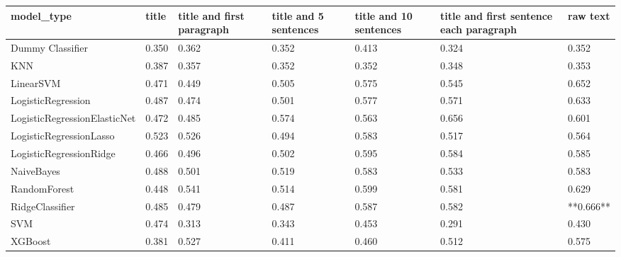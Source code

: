 \begin{tabular}{lllllll}
\toprule
                  model\_type & title & title and first paragraph & title and 5 sentences & title and 10 sentences & title and first sentence each paragraph &  raw text \\
\midrule
            Dummy Classifier & 0.350 &                     0.362 &                 0.352 &                  0.413 &                                   0.324 &     0.352 \\
                         KNN & 0.387 &                     0.357 &                 0.352 &                  0.352 &                                   0.348 &     0.353 \\
                   LinearSVM & 0.471 &                     0.449 &                 0.505 &                  0.575 &                                   0.545 &     0.652 \\
          LogisticRegression & 0.487 &                     0.474 &                 0.501 &                  0.577 &                                   0.571 &     0.633 \\
LogisticRegressionElasticNet & 0.472 &                     0.485 &                 0.574 &                  0.563 &                                   0.656 &     0.601 \\
     LogisticRegressionLasso & 0.523 &                     0.526 &                 0.494 &                  0.583 &                                   0.517 &     0.564 \\
     LogisticRegressionRidge & 0.466 &                     0.496 &                 0.502 &                  0.595 &                                   0.584 &     0.585 \\
                  NaiveBayes & 0.488 &                     0.501 &                 0.519 &                  0.583 &                                   0.533 &     0.583 \\
                RandomForest & 0.448 &                     0.541 &                 0.514 &                  0.599 &                                   0.581 &     0.629 \\
             RidgeClassifier & 0.485 &                     0.479 &                 0.487 &                  0.587 &                                   0.582 & **0.666** \\
                         SVM & 0.474 &                     0.313 &                 0.343 &                  0.453 &                                   0.291 &     0.430 \\
                     XGBoost & 0.381 &                     0.527 &                 0.411 &                  0.460 &                                   0.512 &     0.575 \\
\bottomrule
\end{tabular}
